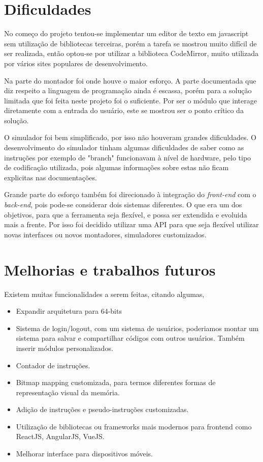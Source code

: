 \section{Dificuldades}

	No começo do projeto tentou-se implementar um editor de texto em javascript sem utilização de bibliotecas terceiras, porém a tarefa se mostrou muito difícil de ser realizada, então optou-se por utilizar a biblioteca CodeMirror, muito utilizada por vários sites populares de desenvolvimento.

	Na parte do montador foi onde houve o maior esforço. A parte documentada que diz respeito a linguagem de programação ainda é escassa, porém para a solução limitada que foi feita neste projeto foi o suficiente. Por ser o módulo que interage diretamente com a entrada do usuário, este se mostrou ser o ponto crítico da solução.

	O simulador foi bem simplificado, por isso não houveram grandes dificuldades. O desenvolvimento do simulador tinham algumas dificuldades de saber como as instruções por exemplo de "branch" funcionavam à nível de hardware, pelo tipo de codificação utilizada, pois algumas informações sobre estas não ficam explicitas nas documentações.

	Grande parte do esforço também foi direcionado à integração do \textit{front-end} com o \textit{back-end}, pois pode-se considerar dois sistemas diferentes. O que era um dos objetivos, para que a ferramenta seja flexível, e possa ser extendida e evoluida mais a frente. Por isso foi decidido utilizar uma API para que seja flexível utilizar novas interfaces ou novos montadores, simuladores customizados.

\section{Melhorias e trabalhos futuros}

	Existem muitas funcionalidades a serem feitas, citando algumas,

	\begin{itemize}
		\item Expandir arquitetura para 64-bits
		\item Sistema de login/logout, com um sistema de usuários, poderiamos montar um sistema para salvar e compartilhar códigos com outros usuários. Também inserir módulos personalizados.
		\item Contador de instruções.
		\item Bitmap mapping customizada, para termos diferentes formas de representação visual da memória.
		\item Adição de instruções e pseudo-instruções customizadas.
		\item Utilização de bibliotecas ou frameworks mais modernos para frontend como ReactJS, AngularJS, VueJS.
		\item Melhorar interface para dispositivos móveis.		
	\end{itemize}

